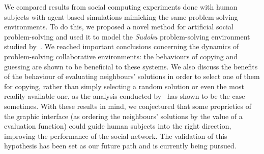 \documentclass{article}
\begin{document}
We compared results from social computing experiments done with human subjects with agent-based simulations mimicking the same problem-solving environments. To do this, we proposed a novel method for artificial social problem-solving and used it to model the {\em Sudoku} problem-solving environment studied by~\cite{farenzena:collabem}. We reached important conclusions concerning the dynamics of problem-solving collaborative environments: the behaviours of copying and guessing are shown to be beneficial to these systems. We also discuss the benefits of the behaviour of evaluating neighbours' solutions in order to select one of them for copying, rather than simply selecting a random solution or even the most readily available one, as the analysis conducted by~\cite{farenzena:collabem} has shown to be the case sometimes. With these results in mind, we conjectured that some proprieties of the graphic interface (as ordering the neighbours' solutions by the value of a evaluation function) could guide human subjects into the right direction, improving the performance of the social network. The validation of this hypothesis has been set as our future path and is currently being pursued.



\end{document}
